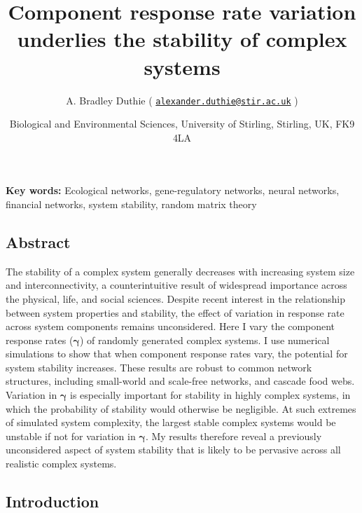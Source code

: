 \documentclass[]{article}
\title{Component response rate variation underlies the stability of complex
systems}
\author{A. Bradley Duthie (
\href{mailto:alexander.duthie@stir.ac.uk}{\nolinkurl{alexander.duthie@stir.ac.uk}}
)}
\date{Biological and Environmental Sciences, University of Stirling, Stirling,
UK, FK9 4LA}
\begin{document}
\maketitle

\textbf{Key words:} Ecological networks, gene-regulatory networks,
neural networks, financial networks, system stability, random matrix
theory

\subsection{Abstract}\label{abstract}

The stability of a complex system generally decreases with increasing
system size and interconnectivity, a counterintuitive result of
widespread importance across the physical, life, and social sciences.
Despite recent interest in the relationship between system properties
and stability, the effect of variation in response rate across system
components remains unconsidered. Here I vary the component response
rates (\(\boldsymbol{\gamma}\)) of randomly generated complex systems. I
use numerical simulations to show that when component response rates
vary, the potential for system stability increases. These results are
robust to common network structures, including small-world and
scale-free networks, and cascade food webs. Variation in
\(\boldsymbol{\gamma}\) is especially important for stability in highly
complex systems, in which the probability of stability would otherwise
be negligible. At such extremes of simulated system complexity, the
largest stable complex systems would be unstable if not for variation in
\(\boldsymbol{\gamma}\). My results therefore reveal a previously
unconsidered aspect of system stability that is likely to be pervasive
across all realistic complex systems.

\subsection{Introduction}\label{introduction}
\end{document}
